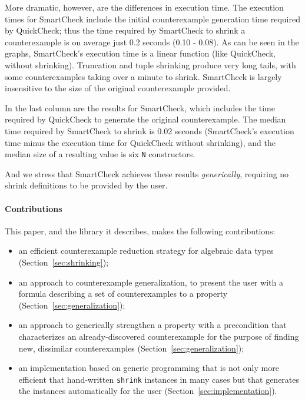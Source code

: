 \documentclass{sigplanconf}
\newcommand{\ttp}[1]{\texttt{#1}}
\begin{document}
More dramatic, however, are the differences
in execution time.  The execution times for SmartCheck include the initial
counterexample generation time required by QuickCheck; thus the time required by
SmartCheck to shrink a counterexample is on average just 0.2 seconds (0.10 -
0.08).  As can be seen in the graphs, SmartCheck's execution time is a linear
function (like QuickCheck, without shrinking).  Truncation and tuple shrinking
produce very long tails, with some counterexamples taking over a minute to
shrink.  SmartCheck is largely insensitive to the size of the original
counterexample provided.

In the last column are the results for SmartCheck, which includes the time
required by QuickCheck to generate the original counterexample.  The median time
required by SmartCheck to shrink is 0.02 seconds (SmartCheck's execution time
minus the execution time for QuickCheck without shrinking), and the median size
of a resulting value is six \ttp{N} constructors.

And we stress that SmartCheck achieves these results \emph{generically},
requiring no shrink definitions to be provided by the user.

\paragraph{Contributions}
This paper, and the library it describes, makes the following contributions:

\begin{itemize}

\item an efficient counterexample reduction strategy for algebraic
  data types (Section~\ref{sec:shrinking});

\item an approach to counterexample generalization, to present the user with a
  formula describing a set of counterexamples to a property
  (Section~\ref{sec:generalization});

\item an approach to generically strengthen a property with a precondition that
  characterizes an already-discovered counterexample for the purpose of finding
  new, dissimilar counterexamples (Section~\ref{sec:generalization});

\item an implementation based on generic programming that is not only more
  efficient that hand-written \ttp{shrink} instances in many cases but that
  generates the instances automatically for the user
  (Section~\ref{sec:implementation}).

\end{itemize}
\end{document}
